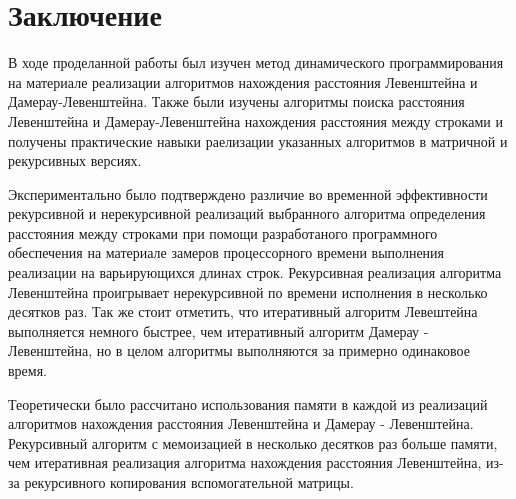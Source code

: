 \chapter{Заключение}

В ходе проделанной работы был изучен метод динамического программирования 
на материале реализации алгоритмов нахождения расстояния Левенштейна и 
Дамерау-Левенштейна. Также были изучены алгоритмы поиска расстояния Левенштейна и 
Дамерау-Левенштейна нахождения расстояния между строками и получены практические
навыки раелизации указанных алгоритмов в матричной и рекурсивных версиях.

Экспериментально было подтверждено различие во временной эффективности рекурсивной
и нерекурсивной реализаций выбранного алгоритма определения расстояния между 
строками при помощи разработаного программного обеспечения на материале замеров
процессорного времени выполнения реализации на варьирующихся длинах строк.
Рекурсивная реализация алгоритма Левенштейна проигрывает нерекурсивной по времени
исполнения в несколько десятков раз. Так же стоит отметить, что итеративный алгоритм
Левештейна выполняется немного быстрее, чем итеративный алгоритм Дамерау - Левенштейна,
но в целом алгоритмы выполняются за примерно одинаковое время.

Теоретически было рассчитано использования памяти в каждой из реализаций алгоритмов 
нахождения расстояния Левенштейна и Дамерау - Левенштейна. Рекурсивный алгоритм с 
мемоизацией в несколько десятков раз больше памяти, чем итеративная реализация 
алгоритма нахождения расстояния Левенштейна, из-за рекурсивного копирования 
вспомогательной матрицы.
